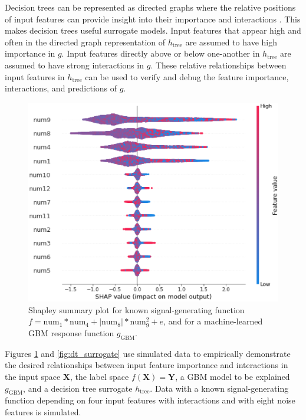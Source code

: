 \documentclass[11pt]{asaproc}
\begin{document}
Decision trees can be represented as directed graphs where the relative positions of input features can provide insight into their importance and interactions \cite{cart}. This makes decision trees useful surrogate models. Input features that appear high and often in the directed graph representation of $h_{\text{tree}}$ are assumed to have high importance in $g$. Input features directly above or below one-another in $h_{\text{tree}}$ are assumed to have strong interactions in $g$. These relative relationships between input features in $h_{\text{tree}}$ can be used to verify and debug the feature importance, interactions, and predictions of $g$.

\begin{figure}
	\begin{center}
		\includegraphics[scale=0.4]{img/figure_2.eps}
		\caption{Shapley summary plot for known signal-generating function $f = \text{num} _1 * \text{num}_4 + |\text{num}_8| * \text{num}_9^2 + e$, and for a machine-learned GBM response function $g_{\text{GBM}}$.}
		\label{fig:global_shapley}
	\end{center}
\end{figure}

Figures \ref{fig:global_shapley} and \ref{fig:dt_surrogate} use simulated data to empirically demonstrate the desired relationships between input feature importance and interactions in the input space $\mathbf{X}$, the label space $f(\mathbf{X}) = \mathbf{Y}$, a GBM model to be explained $g_{\text{GBM}}$, and a decision tree surrogate $h_{\text{tree}}$. Data with a known signal-generating function depending on four input features with interactions and with eight noise features is simulated. 
\end{document}
